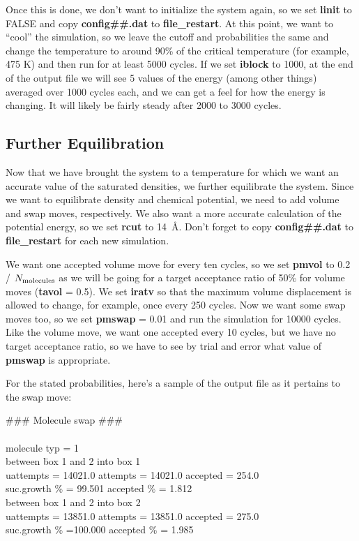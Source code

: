 \documentclass[12pt,letterpaper]{article}
\begin{document}
\noindent Once this is done, we don't want to initialize the
system again, so we set {\bf linit} to FALSE and copy {\bf
  config\#\#.dat} to {\bf file\_restart}. At this point, we
want to ``cool'' the simulation, so we leave the cutoff and
probabilities the same and change the temperature to around
90\% of the critical temperature (for example, 475 K) and
then run for at least 5000 cycles. If we set {\bf iblock} to
1000, at the end of the output file we will see 5 values of
the energy (among other things) averaged over 1000 cycles
each, and we can get a feel for how the energy is changing.
It will likely be fairly steady after 2000 to 3000 cycles.

\subsection{Further Equilibration}
Now that we have brought the system to a temperature for
which we want an accurate value of the saturated densities,
we further equilibrate the system. Since we want to
equilibrate density and chemical potential, we need to add
volume and swap moves, respectively. We also want a more
accurate calculation of the potential energy, so we set {\bf
  rcut} to 14~\AA. Don't forget to copy {\bf config\#\#.dat}
to {\bf file\_restart} for each new simulation.

We want one accepted volume move for every ten cycles, so we
set {\bf pmvol} to 0.2 / $N_{\rm molecules}$ as we will be
going for a target acceptance ratio of 50\% for volume moves
({\bf tavol} = 0.5). We set {\bf iratv} so that the maximum
volume displacement is allowed to change, for example, once
every 250 cycles. Now we want some swap moves too, so we set
{\bf pmswap} = 0.01 and run the simulation for 10000 cycles.
Like the volume move, we want one accepted every 10 cycles,
but we have no target acceptance ratio, so we have to see by
trial and error what value of {\bf pmswap} is appropriate.

For the stated probabilities, here's a sample of the output
file as it pertains to the swap move:

{\bf \begin{tabbing}
\#\#\# Molecule swap \#\#\# \\
\\
 molecule typ = \hskip 24pt 1 \\
between \= box 1 and 2 into box 1\\
   \> uattempts = 14021.0 attempts = 14021.0 accepted = 254.0\\
 suc.growth \% = 99.501   accepted \% = 1.812\\
between box 1 and  2 into box 2\\
   \> uattempts = 13851.0 attempts = 13851.0 accepted = 275.0\\
 suc.growth \% =100.000   accepted \% = 1.985\\
\end{tabbing} }
\end{document}
